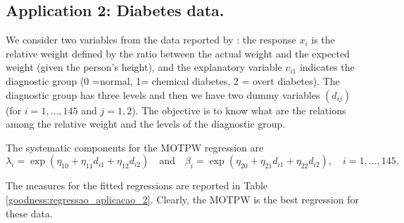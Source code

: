 \documentclass[12pt]{article}
\begin{document}
	


\subsection{Application 2: Diabetes data.}\label{applications2}
	
We consider two variables from the data reported by \cite{Reaven1979}: the response $x_i$ is the relative weight defined by the ratio between
the actual weight and the expected weight (given the person's height), and the explanatory variable $v_{i1}$ indicates the diagnostic group (0 =normal, 1=
chemical diabetes, 2 = overt diabetes). The diagnostic group has three levels and then we have two dummy variables $(d_ {ij})$ (for $i= 1,\ldots,145$
and $j= 1,2$). The objective is to know what are the relations among the relative weight and the levels of the diagnostic group.

The systematic components for the MOTPW regression are
$$\lambda_i =\exp\left(\eta_{10}+\eta_{11}d_{i1}+\eta_{12}d_{i2}\right)\quad \text{and}
\quad \beta_i =\exp\left(\eta_{20}+\eta_{21}d_{i1}+\eta_{22}d_{i2}\right),\quad i=1,\ldots,145.$$
	
The measures for the fitted regressions are reported in Table \ref{goodness:regressao_aplicacao_2}.
Clearly, the MOTPW is the best regression for these data.
	
\end{document}
